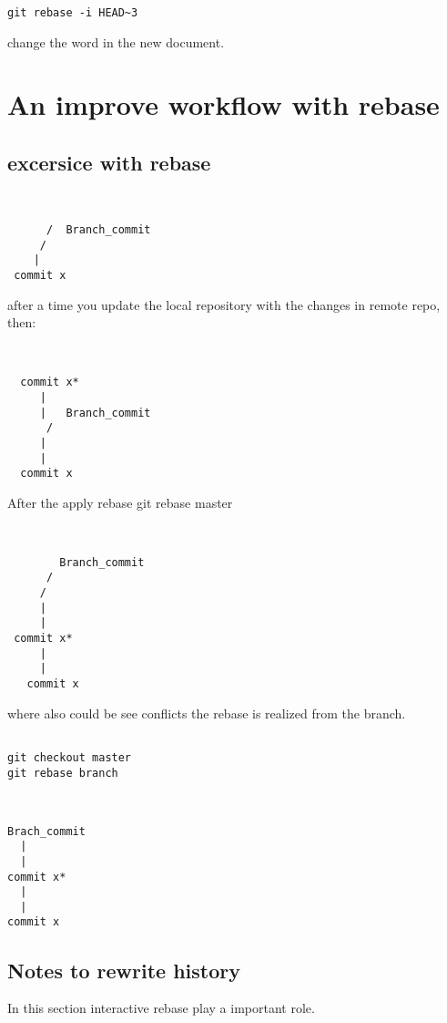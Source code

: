 \documentclass[10pt,a4paper]{article}
\begin{document}
\begin{verbatim}
git rebase -i HEAD~3
\end{verbatim}

change the word in the new document.

\section{An improve workflow with rebase}

\subsection{excersice with rebase}

\begin{verbatim}

 
      /  Branch_commit
     / 
    | 
 commit x

\end{verbatim}

after a time you update the local repository
with the changes in remote repo, then:

\begin{verbatim}


  commit x*
     |
     |   Branch_commit
      / 
     |
     |
  commit x

\end{verbatim}

After the  apply rebase git rebase master

\begin{verbatim}


        Branch_commit
      /  
     /
     | 
     |
 commit x*
     |
     |
   commit x

\end{verbatim}
where also could be see conflicts the rebase is realized from the branch.

\begin{verbatim}

git checkout master 
git rebase branch

\end{verbatim}

\begin{verbatim}


Brach_commit
  |
  |
commit x*
  |
  |
commit x

\end{verbatim}

\subsection{Notes to rewrite history}
In this section interactive rebase play a important role.
\end{document}
